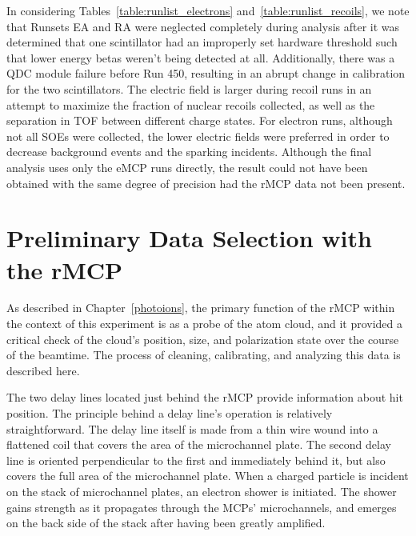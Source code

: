 
In considering Tables~\ref{table:runlist_electrons} and~\ref{table:runlist_recoils}, we note that Runsets EA and RA were neglected completely during analysis after it was determined that one scintillator had an improperly set hardware threshold such that lower energy betas weren't being detected at all.  Additionally, there was a QDC module failure before Run 450, resulting in an abrupt change in calibration for the two scintillators.  The electric field is larger during recoil runs in an attempt to maximize the fraction of nuclear recoils collected, as well as the separation in \ac{TOF} between different charge states.  For electron runs, although not all SOEs were collected, the lower electric fields were preferred in order to decrease background events and the sparking incidents.   Although the final analysis uses only the eMCP runs directly, the result could not have been obtained with the same degree of precision had the rMCP data not been present.  

\section{Preliminary Data Selection with the rMCP}
\label{sec:rmcp_cuts}
As described in Chapter~\ref{photoions}, the primary function of the rMCP within the context of this experiment is as a probe of the atom cloud, and it provided a critical check of the cloud's position, size, and polarization state over the course of the beamtime.  The process of cleaning, calibrating, and analyzing this data is described here.  

The two delay lines located just behind the rMCP provide information about hit position.  The principle behind a delay line's operation is relatively straightforward.  The delay line itself is made from a thin wire wound into a flattened coil that covers the area of the microchannel plate.  The second delay line is oriented perpendicular to the first and immediately behind it, but also covers the full area of the microchannel plate.  When a charged particle is incident on the stack of microchannel plates, an electron shower is initiated.  The shower gains strength as it propagates through the MCPs' microchannels, and emerges on the back side of the stack after having been greatly amplified.  

